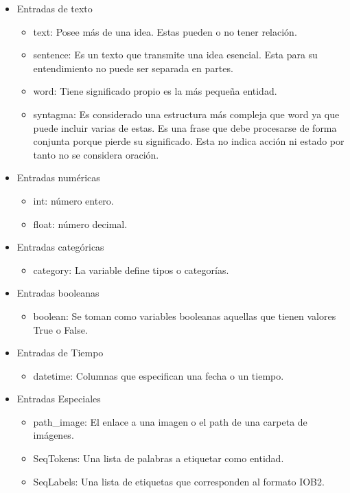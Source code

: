 \begin{itemize}
    \item Entradas de texto
    \begin{itemize}
        \item text: Posee más de una idea. Estas pueden o no tener relación.
        \item sentence: Es un texto que transmite una idea esencial. Esta para su entendimiento no puede ser separada en partes.
        \item word: Tiene significado propio es la más pequeña entidad.
        \item syntagma: Es considerado una estructura más compleja que word ya que puede incluir varias de estas. Es una frase 
        que debe procesarse de forma conjunta porque pierde su significado. Esta no indica acción ni estado por tanto no se considera oración. 
    \end{itemize}      
    
    \item Entradas numéricas
    \begin{itemize}
        \item int: número entero.
        \item float: número decimal.
    \end{itemize}

    \item Entradas categóricas
    \begin{itemize}
        \item category: La variable define tipos o categorías.
    \end{itemize}
    
    \item Entradas booleanas
    \begin{itemize}
        \item boolean: Se toman como variables booleanas aquellas que tienen valores True o False.
    \end{itemize}
    
    \item Entradas de Tiempo
    \begin{itemize}
        \item datetime: Columnas que especifican una fecha o un tiempo.
    \end{itemize}
    
    \item Entradas Especiales
    \begin{itemize}
        \item path\_image: El enlace a una imagen o el path de una carpeta de imágenes.
        \item SeqTokens: Una lista de palabras a etiquetar como entidad.
        \item SeqLabels: Una lista de etiquetas que corresponden al formato IOB2. 
    \end{itemize}
\end{itemize}

